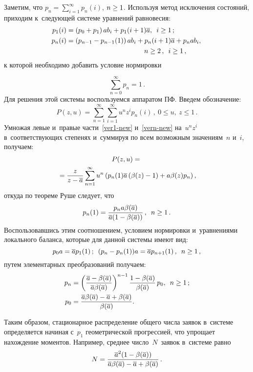 \begin{multicols}{2}
Заметим, что $p_n = \sum\nolimits_{i=1}^{\infty} p_n(i)$, $n \hm\ge 1$.
Используя метод исключения состояний,
приходим к~сле\-ду\-ющей системе уравнений равновесия:
\begin{align}
\label{ver1-new}
\!p_1(i) &=\left(p_0 + p_1 \right)a b_i+
p_1(i+1)\overline{a},\enskip  i \ge 1\,;
\\
\!p_n(i) &=
\left(p_{n-1}-p_{n-1}(1)\right) a b_i +
p_{n}(i+1) \overline{a} + p_{n} a b_i,\notag\\
& \hspace*{40mm}n \ge 2\,, \enskip i \ge 1\,,
\label{vern-new}
\end{align}
к которой необходимо добавить условие нор\-ми\-ровки

\vspace*{-2pt}

\noindent
$$
\sum\limits_{n=0}^\infty p_n =1\,.
$$
Для решения этой системы воспользуемся аппаратом ПФ. Введем обозначение:
$$
P(z,u) = \sum\limits_{n=1}^{\infty}  \sum\limits_{i=1}^{\infty} u^n z^i p_n(i)\,,\
0\le u,\ z\le 1\,.
$$
 Умножая левые и~правые части~\eqref{ver1-new} 
и~\eqref{vern-new}
на~$u^nz^i$ в~соответствующих степенях и~суммируя по всем возможным значениям~$n$ и~$i$,
получаем:
\begin{multline}
P(z,u)= {}\\
{}=\displaystyle\frac{\displaystyle z\mathstrut}{\displaystyle z-\overline{a}\mathstrut}
\sum\limits_{n=1}^{\infty}  u^n \left (
p_n(1)\overline{a} \left( \beta(z) -1\right)
+a \beta(z) p_n
\right ), 
\label{eq_Pzu}
\end{multline}
откуда по теореме Руше следует, что
$$
p_n(1) = \fr{p_n a \beta(\overline{a})}{\overline{a} 
( 1\hm- \beta(\overline{a}))}\,,\enskip n \ge 1\,.
$$
Воспользовавшись этим соотношением, условием нормировки
и~уравнениями локального баланса, которые для данной системы имеют
вид:
$$
p_0 a = \overline{a} p_1(1)\,; \enskip
(p_n- p_n(1))a = \overline{a} p_{n+1}(1)\,, \enskip n \geq 1\,,
$$
путем элементарных преобразований получаем:
\begin{align}
\label{pn}
p_n &= \left( \displaystyle\frac{\displaystyle \overline{a} - \beta(\overline{a})\mathstrut}{\displaystyle \overline{a} \beta(\overline{a})\mathstrut}
\right)^{n-1}
\displaystyle\frac{\displaystyle 1- \beta(\overline{a})\mathstrut}{\displaystyle \beta(\overline{a})\mathstrut}\, p_0, \enskip n\geq 1\,;
\\
\label{p0}
p_0 &= \displaystyle\frac{\displaystyle \overline{a} \beta(\overline{a}) - \overline{a} + \beta(\overline{a})\mathstrut}{\displaystyle \beta(\overline{a})\mathstrut}.
\end{align}

Таким образом, стационарное распределение
общего числа заявок в~системе определяется начиная с~$p_1$
геометрической прогрессией, что упрощает
нахождение моментов. Например, среднее число~$N$~заявок в~системе равно
$$
N = \fr{\overline{a}^2 (1\hm- \beta(\overline{a}))}{\overline{a}
 \beta(\overline{a})\hm- \overline{a} \hm+ \beta(\overline{a})}\,.
 $$


\end{multicols}
